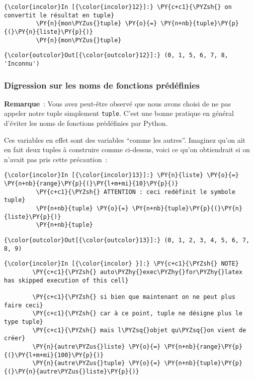     \begin{Verbatim}[commandchars=\\\{\}]
{\color{incolor}In [{\color{incolor}12}]:} \PY{c+c1}{\PYZsh{} on convertit le résultat en tuple}
         \PY{n}{mon\PYZus{}tuple} \PY{o}{=} \PY{n+nb}{tuple}\PY{p}{(}\PY{n}{liste}\PY{p}{)}
         \PY{n}{mon\PYZus{}tuple}
\end{Verbatim}


\begin{Verbatim}[commandchars=\\\{\}]
{\color{outcolor}Out[{\color{outcolor}12}]:} (0, 1, 5, 6, 7, 8, 'Inconnu')
\end{Verbatim}
            
    \hypertarget{digression-sur-les-noms-de-fonctions-pruxe9duxe9finies}{%
\subsubsection{Digression sur les noms de fonctions
prédéfinies}\label{digression-sur-les-noms-de-fonctions-pruxe9duxe9finies}}

    \textbf{Remarque}~: Vous avez peut-être observé que nous avons choisi de
ne pas appeler notre tuple simplement \texttt{tuple}. C'est une bonne
pratique en général d'éviter les noms de fonctions prédéfinies par
Python.

Ces variables en effet sont des variables ``comme les autres''. Imaginez
qu'on ait en fait deux tuples à construire comme ci-dessus, voici ce
qu'on obtiendrait si on n'avait pas pris cette précaution~:

    \begin{Verbatim}[commandchars=\\\{\}]
{\color{incolor}In [{\color{incolor}13}]:} \PY{n}{liste} \PY{o}{=} \PY{n+nb}{range}\PY{p}{(}\PY{l+m+mi}{10}\PY{p}{)}
         \PY{c+c1}{\PYZsh{} ATTENTION : ceci redéfinit le symbole tuple}
         \PY{n+nb}{tuple} \PY{o}{=} \PY{n+nb}{tuple}\PY{p}{(}\PY{n}{liste}\PY{p}{)}
         \PY{n+nb}{tuple}
\end{Verbatim}


\begin{Verbatim}[commandchars=\\\{\}]
{\color{outcolor}Out[{\color{outcolor}13}]:} (0, 1, 2, 3, 4, 5, 6, 7, 8, 9)
\end{Verbatim}
            
    \begin{Verbatim}[commandchars=\\\{\}]
{\color{incolor}In [{\color{incolor} }]:} \PY{c+c1}{\PYZsh{} NOTE}
        \PY{c+c1}{\PYZsh{} auto\PYZhy{}exec\PYZhy{}for\PYZhy{}latex has skipped execution of this cell}
        
        \PY{c+c1}{\PYZsh{} si bien que maintenant on ne peut plus faire ceci}
        \PY{c+c1}{\PYZsh{} car à ce point, tuple ne désigne plus le type tuple}
        \PY{c+c1}{\PYZsh{} mais l\PYZsq{}objet qu\PYZsq{}on vient de créer}
        \PY{n}{autre\PYZus{}liste} \PY{o}{=} \PY{n+nb}{range}\PY{p}{(}\PY{l+m+mi}{100}\PY{p}{)}
        \PY{n}{autre\PYZus{}tuple} \PY{o}{=} \PY{n+nb}{tuple}\PY{p}{(}\PY{n}{autre\PYZus{}liste}\PY{p}{)}
\end{Verbatim}


